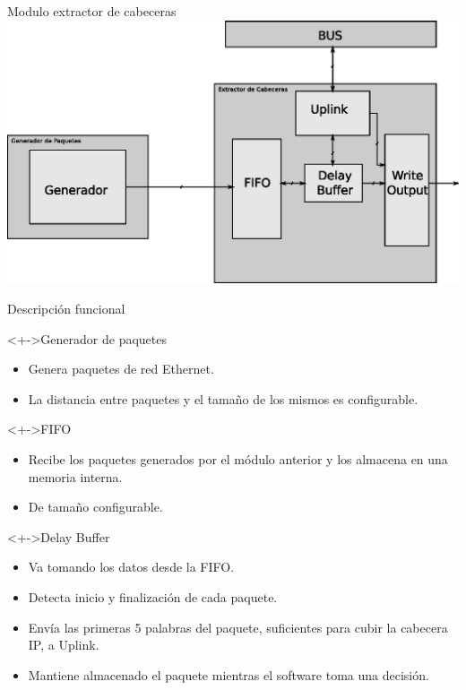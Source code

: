 \documentclass[xcolor=dvipsnames]{beamer}
\begin{document}
\begin{frame}{Modulo extractor de cabeceras}
\center 
\includegraphics[scale=0.60]{figures/modulo.eps}

\end{frame}
\begin{frame}{Descripción funcional}
\begin{block}<+->{Generador de paquetes}   
    \begin{itemize}
      \scriptsize
     	\item Genera paquetes de red Ethernet.
	\item La distancia entre paquetes y el tamaño de los mismos es configurable. 
    \end{itemize}
  \end{block}
\begin{block}<+->{FIFO}   
    \begin{itemize}
      \scriptsize
     	\item Recibe los paquetes generados por el módulo anterior y los almacena en una memoria interna.
	\item De tamaño configurable.
    \end{itemize}
  \end{block}
\begin{block}<+->{Delay Buffer}   
    \begin{itemize}
      \scriptsize
     	\item Va tomando los datos desde la FIFO.
	\item Detecta inicio y finalización de cada paquete.
	\item Envía las primeras 5 palabras del paquete, suficientes para cubir la cabecera IP, a Uplink.
	\item Mantiene almacenado el paquete mientras el software toma una decisión.
    \end{itemize}
  \end{block}
\end{frame}
\end{document}
